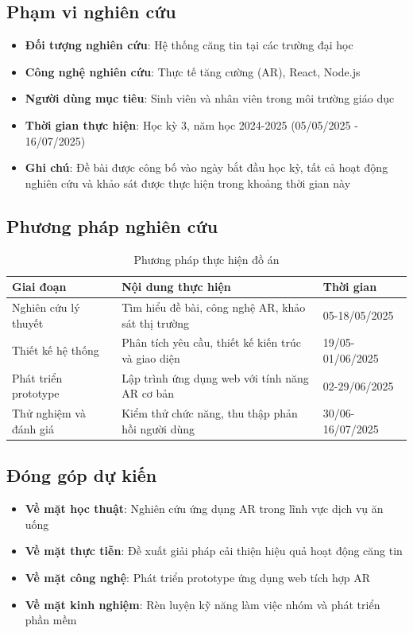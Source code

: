 \documentclass[12pt,a4paper]{article}
\begin{document}
\subsection*{Phạm vi nghiên cứu}
\begin{itemize}[leftmargin=1cm]
    \item \textbf{Đối tượng nghiên cứu}: Hệ thống căng tin tại các trường đại học
    \item \textbf{Công nghệ nghiên cứu}: Thực tế tăng cường (AR), React, Node.js
    \item \textbf{Người dùng mục tiêu}: Sinh viên và nhân viên trong môi trường giáo dục
    \item \textbf{Thời gian thực hiện}: Học kỳ 3, năm học 2024-2025 (05/05/2025 - 16/07/2025)
    \item \textbf{Ghi chú}: Đề bài được công bố vào ngày bắt đầu học kỳ, tất cả hoạt động nghiên cứu và khảo sát được thực hiện trong khoảng thời gian này
\end{itemize}

\subsection*{Phương pháp nghiên cứu}
\begin{table}[H]
\centering
\begin{tabular}{@{}lp{6cm}p{2cm}@{}}
\toprule
\textbf{Giai đoạn} & \textbf{Nội dung thực hiện} & \textbf{Thời gian} \\
\midrule
Nghiên cứu lý thuyết & Tìm hiểu đề bài, công nghệ AR, khảo sát thị trường & 05-18/05/2025 \\
Thiết kế hệ thống & Phân tích yêu cầu, thiết kế kiến trúc và giao diện & 19/05-01/06/2025 \\
Phát triển prototype & Lập trình ứng dụng web với tính năng AR cơ bản & 02-29/06/2025 \\
Thử nghiệm và đánh giá & Kiểm thử chức năng, thu thập phản hồi người dùng & 30/06-16/07/2025 \\
\bottomrule
\end{tabular}
\caption{Phương pháp thực hiện đồ án}
\end{table}

\subsection*{Đóng góp dự kiến}
\begin{itemize}[leftmargin=1cm]
    \item \textbf{Về mặt học thuật}: Nghiên cứu ứng dụng AR trong lĩnh vực dịch vụ ăn uống
    \item \textbf{Về mặt thực tiễn}: Đề xuất giải pháp cải thiện hiệu quả hoạt động căng tin
    \item \textbf{Về mặt công nghệ}: Phát triển prototype ứng dụng web tích hợp AR
    \item \textbf{Về mặt kinh nghiệm}: Rèn luyện kỹ năng làm việc nhóm và phát triển phần mềm
\end{itemize}
\end{document}

